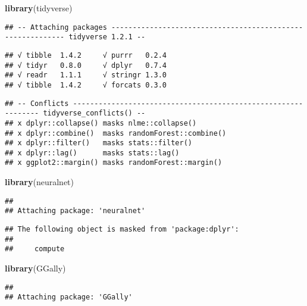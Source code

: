 \documentclass[]{article}
\newenvironment{Shaded}{\begin{snugshade}}{\end{snugshade}}
\newcommand{\KeywordTok}[1]{\textcolor[rgb]{0.13,0.29,0.53}{\textbf{#1}}}
\newcommand{\NormalTok}[1]{#1}
\begin{document}
\begin{Shaded}
\begin{Highlighting}[]
\KeywordTok{library}\NormalTok{(tidyverse)}
\end{Highlighting}
\end{Shaded}

\begin{verbatim}
## -- Attaching packages ----------------------------------------------------------- tidyverse 1.2.1 --
\end{verbatim}

\begin{verbatim}
## √ tibble  1.4.2     √ purrr   0.2.4
## √ tidyr   0.8.0     √ dplyr   0.7.4
## √ readr   1.1.1     √ stringr 1.3.0
## √ tibble  1.4.2     √ forcats 0.3.0
\end{verbatim}

\begin{verbatim}
## -- Conflicts -------------------------------------------------------------- tidyverse_conflicts() --
## x dplyr::collapse() masks nlme::collapse()
## x dplyr::combine()  masks randomForest::combine()
## x dplyr::filter()   masks stats::filter()
## x dplyr::lag()      masks stats::lag()
## x ggplot2::margin() masks randomForest::margin()
\end{verbatim}

\begin{Shaded}
\begin{Highlighting}[]
\KeywordTok{library}\NormalTok{(neuralnet)}
\end{Highlighting}
\end{Shaded}

\begin{verbatim}
## 
## Attaching package: 'neuralnet'
\end{verbatim}

\begin{verbatim}
## The following object is masked from 'package:dplyr':
## 
##     compute
\end{verbatim}

\begin{Shaded}
\begin{Highlighting}[]
\KeywordTok{library}\NormalTok{(GGally)}
\end{Highlighting}
\end{Shaded}

\begin{verbatim}
## 
## Attaching package: 'GGally'
\end{verbatim}
\end{document}
